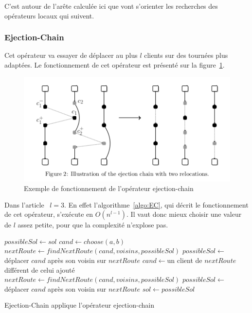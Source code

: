 \documentclass[a4paper,11pt]{article}%
\begin{document}
C'est autour de l'arête calculée ici que vont s'orienter les recherches des opérateurs locaux qui suivent.
 
\subsubsection{Ejection-Chain}

Cet opérateur va essayer de déplacer au plus $l$ clients sur des tournées plus adaptées. Le fonctionnement de cet opérateur est présenté sur la figure~\ref{EC}.

\begin{figure}
\centering
\includegraphics[scale=0.4]{ejection_chain.png}
\caption{Exemple de fonctionnement de l'opérateur ejection-chain}
\label{EC}
\end{figure}

Dans l'article~\cite{Sorensen_2017} $l = 3$. En effet l'algorithme~\ref{algo:EC}, qui décrit le fonctionnement de cet opérateur, s'exécute en $O(n^{l-1})$. Il vaut donc mieux choisir une valeur de $l$ assez petite, pour que la complexité n'explose pas. 

\begin{algorithm}
\DontPrintSemicolon %
$possibleSol \gets sol$\;
$cand \gets choose(a,b)$\;
$nextRoute \gets findNextRoute(cand,voisins,possibleSol)$\;
$possibleSol \gets $ déplacer $cand$ après son voisin sur $nextRoute$\;
 {
  $cand \gets $un client de $nextRoute$ différent de celui ajouté\;
  $nextRoute \gets findNextRoute(cand,voisins,possibleSol)$\;
  $possibleSol \gets$ déplacer $cand$ après son voisin sur $nextRoute$\;
}
 {
	$sol \gets possibleSol$\;
}
\;
\caption{{\sc Ejection-Chain} applique l'opérateur ejection-chain}
\label{algo:EC}
\end{algorithm}
\end{document}
